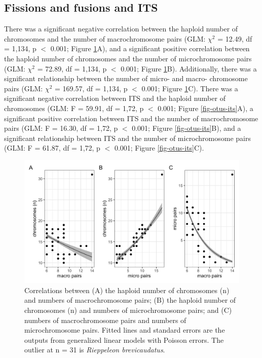 \documentclass[a4paper, 12pt]{article}
\begin{document}
\newpage


\subsection{Fissions and fusions and ITS}
There was a significant negative correlation between the haploid number of chromosomes and the number of macrochromosome pairs (GLM: $\chi^2$ = 12.49, df = 1,134, p $<$ 0.001; Figure \ref{fig-otus-macro}A), and a significant positive correlation between the haploid number of chromosomes and the number of microchromosome pairs (GLM: $\chi^2$ = 72.89, df = 1,134, p $<$ 0.001; Figure \ref{fig-otus-macro}B). Additionally, there was a significant relationship between the number of micro- and macro- chromosome pairs (GLM: $\chi^2$ = 169.57, df = 1,134, p $<$ 0.001; Figure \ref{fig-otus-macro}C). There was a significant negative correlation between ITS and the haploid number of chromosomes (GLM: F = 59.91, df = 1,72, p $<$ 0.001; Figure \ref{fig-otus-its}A), a significant positive correlation between ITS and the number of macrochromosome pairs (GLM: F = 16.30, df = 1,72, p $<$ 0.001; Figure \ref{fig-otus-its}B), and a significant relationship between ITS and the number of microchromosome pairs (GLM: F = 61.87, df = 1,72, p $<$ 0.001; Figure \ref{fig-otus-its}C). 

\begin{figure}[H]
 \centering
  \includegraphics[width = \linewidth]{figures/micro-macro-chromosomes.png}
  \caption{Correlations between (A) the haploid number of chromosomes (n) and numbers of macrochromosome pairs; (B) the haploid number of chromosomes (n) and numbers of microchromosome pairs; and (C) numbers of macrochromosome pairs and numbers of microchromosome pairs. Fitted lines and standard errors are the outputs from generalized linear models with Poisson errors. The outlier at n = 31 is \textit{Rieppeleon brevicaudatus}.
}
  \label{fig-otus-macro}
\end{figure} 
\end{document}
